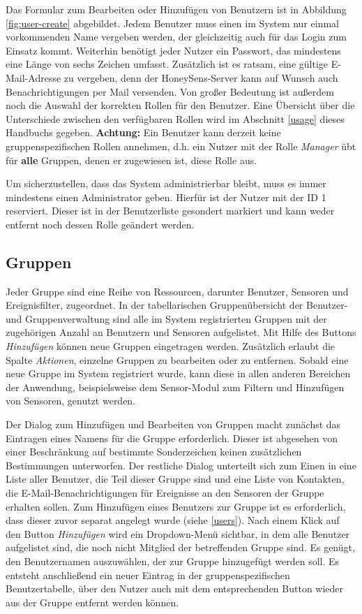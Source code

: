 \documentclass[12pt]{article}
\begin{document}
Das Formular zum Bearbeiten oder Hinzufügen von Benutzern ist in Abbildung \ref{fig:user-create} abgebildet. Jedem Benutzer muss einen im System nur einmal vorkommenden Name vergeben werden, der gleichzeitig auch für das Login zum Einsatz kommt. Weiterhin benötigt jeder Nutzer ein Passwort, das mindestens eine Länge von sechs Zeichen umfasst. Zusätzlich ist es ratsam, eine gültige E-Mail-Adresse zu vergeben, denn der HoneySens-Server kann auf Wunsch auch Benachrichtigungen per Mail versenden. Von großer Bedeutung ist außerdem noch die Auswahl der korrekten Rollen für den Benutzer. Eine Übersicht über die Unterschiede zwischen den verfügbaren Rollen wird im Abschnitt \ref{usage} dieses Handbuchs gegeben. \textbf{Achtung:} Ein Benutzer kann derzeit keine gruppenspezifischen Rollen annehmen, d.h. ein Nutzer mit der Rolle \textit{Manager} übt für \textbf{alle} Gruppen, denen er zugewiesen ist, diese Rolle aus.

Um sicherzustellen, dass das System administrierbar bleibt, muss es immer mindestens einen Administrator geben. Hierfür ist der Nutzer mit der ID 1 reserviert. Dieser ist in der Benutzerliste gesondert markiert und kann weder entfernt noch dessen Rolle geändert werden.

\subsection{Gruppen} \label{groups}
Jeder Gruppe sind eine Reihe von Ressourcen, darunter Benutzer, Sensoren und Ereignisfilter, zugeordnet. In der tabellarischen Gruppenübersicht der Benutzer- und Gruppenverwaltung sind alle im System registrierten Gruppen mit der zugehörigen Anzahl an Benutzern und Sensoren aufgelistet. Mit Hilfe des Buttons \textit{Hinzufügen} können neue Gruppen eingetragen werden. Zusätzlich erlaubt die Spalte \textit{Aktionen}, einzelne Gruppen zu bearbeiten oder zu entfernen. Sobald eine neue Gruppe im System registriert wurde, kann diese in allen anderen Bereichen der Anwendung, beispielsweise dem Sensor-Modul zum Filtern und Hinzufügen von Sensoren, genutzt werden.

Der Dialog zum Hinzufügen und Bearbeiten von Gruppen macht zunächst das Eintragen eines Namens für die Gruppe erforderlich. Dieser ist abgesehen von einer Beschränkung auf bestimmte Sonderzeichen keinen zusätzlichen Bestimmungen unterworfen. Der restliche Dialog unterteilt sich zum Einen in eine Liste aller Benutzer, die Teil dieser Gruppe sind und eine Liste von Kontakten, die E-Mail-Benachrichtigungen für Ereignisse an den Sensoren der Gruppe erhalten sollen. Zum Hinzufügen eines Benutzers zur Gruppe ist es erforderlich, dass dieser zuvor separat angelegt wurde (siehe \ref{users}). Nach einem Klick auf den Button \textit{Hinzufügen} wird ein Dropdown-Menü sichtbar, in dem alle Benutzer aufgelistet sind, die noch nicht Mitglied der betreffenden Gruppe sind. Es genügt, den Benutzernamen auszuwählen, der zur Gruppe hinzugefügt werden soll. Es entsteht anschließend ein neuer Eintrag in der gruppenspezifischen Benutzertabelle, über den Nutzer auch mit dem entsprechenden Button wieder aus der Gruppe entfernt werden können.
\end{document}
